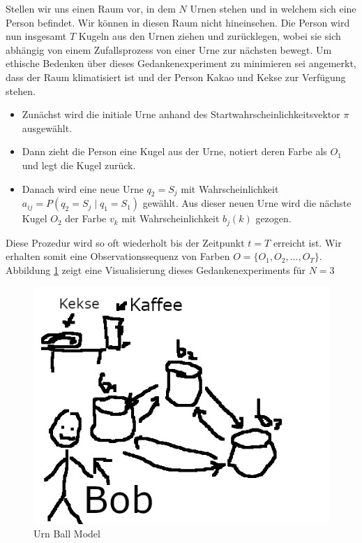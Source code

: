 Stellen wir uns einen Raum vor, in dem $N$ Urnen stehen und in welchem sich eine Person befindet. Wir können in diesen Raum nicht hineinsehen. Die Person wird nun insgesamt $T$ Kugeln aus den Urnen ziehen und zurücklegen, wobei sie sich abhängig von einem Zufallsprozess von einer Urne zur nächsten bewegt. Um ethische Bedenken über dieses Gedankenexperiment zu minimieren sei angemerkt, dass der Raum klimatisiert ist und der Person Kakao und Kekse zur Verfügung stehen.
\begin{itemize}
    \item Zunächst wird die initiale Urne anhand des Startwahrscheinlichkeitsvektor $\pi$ ausgewählt.
    \item Dann zieht die Person eine Kugel aus der Urne, notiert deren Farbe als $O_1$ und legt die Kugel zurück.
    \item Danach wird eine neue Urne $q_2 = S_j$ mit Wahrscheinlichkeit $a_{ij} = P(q_2 = S_j \mid q_1 = S_1)$ gewählt. Aus dieser neuen Urne wird die nächste Kugel $O_2$ der Farbe $v_k$ mit Wahrscheinlichkeit $b_j(k)$ gezogen.
\end{itemize}
Diese Prozedur wird so oft wiederholt bis der Zeitpunkt $t=T$ erreicht ist. Wir erhalten somit eine Observationssequenz von Farben $O= \{O_1, O_2, \dots, O_T \}$.
Abbildung \ref{fig:urn_ball_model} zeigt eine Visualisierung dieses Gedankenexperiments für $N=3$

\begin{figure}[h!]
    \includegraphics[scale=1.0]{images/Ball_Urn_Model.png}
    \caption{Urn Ball Model}
    \label{fig:urn_ball_model}
\end{figure}

